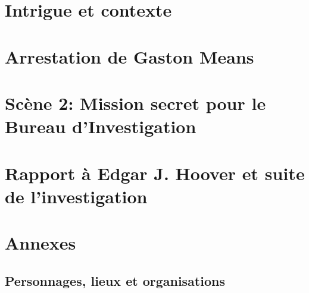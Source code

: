 \documentclass[a4paper,10pt]{article}
\title{}
\author{}
\begin{document}



\begin{abstract}
\end{abstract}




\section{Intrigue et contexte}

\pagebreak
\section{Arrestation de Gaston Means}

\pagebreak
\section{Scène 2: Mission secret pour le Bureau d'Investigation}

\pagebreak
\section{Rapport à Edgar J. Hoover et suite de l'investigation}

\pagebreak
\section{Annexes}
\subsection{Personnages, lieux et organisations}
\printglossaries
\end{document}
